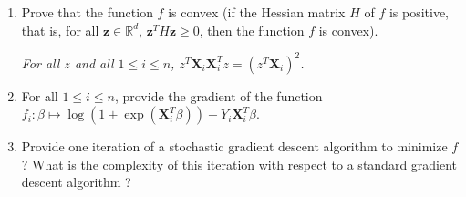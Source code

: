 \documentclass[a4paper,10pt,fleqn]{article}
\newcommand{\eqsp}{\,}
\newcommand{\1}{\ensuremath{\mathbbm{1}}}
\newcommand{\bX}{\mathbf{X}}
\newcommand{\bz}{\mathbf{z}}
\begin{document}
\begin{enumerate}
\vspace{.2cm}

{\em
It is enough to write, for all $1\leqslant i\leqslant n$,
$$
\nabla_{\beta}\left\{ \frac{\exp(\bX_{i}^T\beta)}{1  + \exp(\bX_{i}^T\beta)} \bX_i\right\} =  \frac{\exp(\bX_{i}^T\beta)}{(1  + \exp(\bX_{i}'\beta))^2} \bX_i\bX_i^T\eqsp.
$$
}
	
	\item Prove that the function $f$ is convex (if the Hessian matrix $H$ of $f$ is positive, that is, for all $\bz \in \mathbb{R}^d$, $\bz^T H \bz \geqslant 0$, then the function $f$ is convex). 

\vspace{.2cm}

{\em
For all $z$ and all $1\leqslant i\leqslant n$, $z^T\bX_i\bX_i^Tz = (z^T\bX_i)^2$.
}
	
	\item For all $1\leqslant i \leqslant n$, provide the gradient of the function $f_i: \beta \mapsto \log(1+\exp(\bX_{i}^T\beta))- Y_{i}\bX_{i}^T\beta$.
	
\item Provide one iteration of a stochastic gradient descent algorithm to minimize $f$ ? What is the complexity of this iteration with respect to a standard gradient descent algorithm ?
\end{enumerate}
\end{document}
